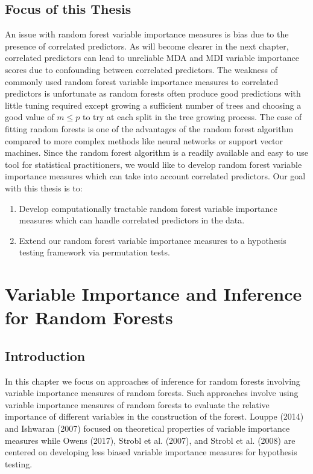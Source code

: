 \documentclass[12pt,twoside]{reedthesis}
\theoremstyle{definition}
\theoremstyle{definition}
\theoremstyle{definition}
\theoremstyle{remark}
\begin{document}
\newpage

\section{Focus of this Thesis}\label{focus-of-this-thesis}

An issue with random forest variable importance measures is bias due to
the presence of correlated predictors. As will become clearer in the
next chapter, correlated predictors can lead to unreliable MDA and MDI
variable importance scores due to confounding between correlated
predictors. The weakness of commonly used random forest variable
importance measures to correlated predictors is unfortunate as random
forests often produce good predictions with little tuning required
except growing a sufficient number of trees and choosing a good value of
\(m\leq p\) to try at each split in the tree growing process. The ease
of fitting random forests is one of the advantages of the random forest
algorithm compared to more complex methods like neural networks or
support vector machines. Since the random forest algorithm is a readily
available and easy to use tool for statistical practitioners, we would
like to develop random forest variable importance measures which can
take into account correlated predictors. Our goal with this thesis is
to:
\begin{enumerate}
  \item Develop computationally tractable random forest variable importance measures which can handle correlated predictors in the data. 
  \item Extend our random forest variable importance measures to a hypothesis testing framework via permutation tests. 
  \end{enumerate}
\par

\chapter{Variable Importance and Inference for Random
Forests}\label{variable-importance-and-inference-for-random-forests}

\section{Introduction}\label{introduction-1}

In this chapter we focus on approaches of inference for random forests
involving variable importance measures of random forests. Such
approaches involve using variable importance measures of random forests
to evaluate the relative importance of different variables in the
construction of the forest. Louppe (2014) and Ishwaran (2007) focused on
theoretical properties of variable importance measures while Owens
(2017), Strobl et al. (2007), and Strobl et al. (2008) are centered on
developing less biased variable importance measures for hypothesis
testing. \par
\end{document}
